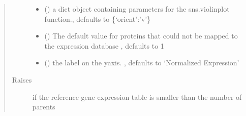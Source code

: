 \documentclass[letterpaper,10pt,english]{sphinxmanual}
\begin{document}
\begin{fulllineitems}
\begin{quote}
\begin{description}
\begin{itemize}
\item {} 
 (\sphinxstyleliteralemphasis{\sphinxupquote{{[}}}\sphinxstyleliteralemphasis{\sphinxupquote{,}}\sphinxstyleliteralemphasis{\sphinxupquote{{]}}}\sphinxstyleliteralemphasis{\sphinxupquote{, }}) \textendash{} a dict object containing parameters for the sns.violinplot function., defaults to \{‘orient’:’v’\}

\item {} 
 (\sphinxstyleliteralemphasis{\sphinxupquote{, }}) \textendash{} The default value for proteins that could not be mapped to the expression database , defaults to \sphinxhyphen{}1

\item {} 
 (\sphinxstyleliteralemphasis{\sphinxupquote{, }}) \textendash{} the label on the y\sphinxhyphen{}axis. , defaults to ‘Normalized Expression’

\end{itemize}

\item[{Raises}] \leavevmode
{} \textendash{} if the reference gene expression table is smaller than the number of parents

\end{description}\end{quote}

\end{fulllineitems}

\end{document}
